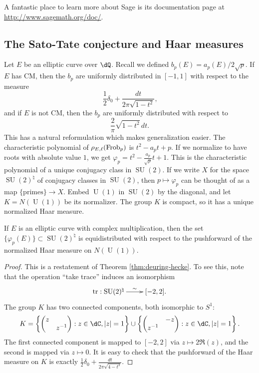 A fantastic place to learn more about Sage is its documentation page at 
\url{http://www.sagemath.org/doc/}. 






\subsection{The Sato-Tate conjecture and Haar measures}

Let $E$ be an elliptic curve over $\dQ$. Recall we defined 
$b_p(E) = a_p(E)/2\sqrt p$. If $E$ has CM, then the $b_p$ are 
uniformly distributed in $[-1,1]$ with respect to the measure 
\[
  \frac 1 2 \delta_0 + \frac{dt}{2\pi\sqrt{1-t^2}} \text{,}
\]
and if $E$ is not CM, then the $b_p$ are uniformly distributed with respect to 
\[
  \frac{2}{\pi} \sqrt{1-t^2}\, dt \text{.}
\]
This has a natural reformulation which makes generalization easier. The 
characteristic polynomial of $\rho_{E,\ell}(\mathrm{Frob}_p)$ is 
$t^2-a_p t + p$. If we normalize to have roots with absolute value $1$, we get 
$\varphi_p = t^2 - \frac{a_p}{\sqrt p} t + 1$. This is the characteristic 
polynomial of a unique conjugacy class in $\operatorname{SU}(2)$. If we write 
$X$ for the space $\operatorname{SU}(2)^\natural$ of 
conjugacy classes in $\operatorname{SU}(2)$, then $p\mapsto \varphi_p$ can be 
thought of as a map $\{\text{primes}\} \to X$. Embed $\operatorname{U}(1)$ in 
$\operatorname{SU}(2)$ by the diagonal, and let $K=N(\operatorname{U}(1))$ be 
its normalizer. The group $K$ is compact, so it has a unique normalized Haar 
measure.

\begin{theorem}
If $E$ is an elliptic curve with complex multiplication, then the 
set $\{\varphi_p(E)\}\subset \operatorname{SU}(2)^\natural$ is 
equidistributed with respect to the pushforward of the normalized Haar measure 
on $N(\operatorname{U}(1))$. 
\end{theorem}
\begin{proof}
This is a restatement of Theorem \ref{thm:deuring-hecke}. To see this, note 
that the operation ``take trace'' induces an isomorphism 
\[\xymatrix{
  \trace : \operatorname{SU}(2)^\natural \ar[r]^-\sim 
    & [-2,2] \text{.}
}\]
The group $K$ has two connected components, both isomorphic to $S^1$:
\[
  K = 
  \left\{\begin{pmatrix} z & \\ & z^{-1} \end{pmatrix} : z\in \dC,|z|=1 \right\} \cup \left\{\begin{pmatrix}  & -z\\ z^{-1} & \end{pmatrix} : z\in \dC ,|z|=1\right\} \text{.}
\]
The first connected component is mapped to $[-2,2]$ via 
$z\mapsto 2\Re (z)$, and the second is mapped via $z\mapsto 0$. It is easy to 
check that the pushforward of the Haar measure on $K$ is exactly 
$\frac 1 2 \delta_0 + \frac{dt}{2\pi \sqrt{4-t^2}}$. 
\end{proof}

